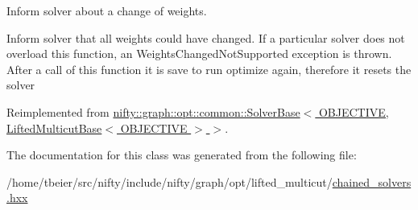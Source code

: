Inform solver about a change of weights. 

Inform solver that all weights could have changed. If a particular solver does not overload this function, an Weights\+Changed\+Not\+Supported exception is thrown. After a call of this function it is save to run optimize again, therefore it resets the solver 

Reimplemented from \hyperlink{classnifty_1_1graph_1_1opt_1_1common_1_1SolverBase_a6a5d77ee514c4b5f44d1908c1000f0ff}{nifty\+::graph\+::opt\+::common\+::\+Solver\+Base$<$ O\+B\+J\+E\+C\+T\+I\+V\+E, Lifted\+Multicut\+Base$<$ O\+B\+J\+E\+C\+T\+I\+V\+E $>$ $>$}.



The documentation for this class was generated from the following file\+:\begin{DoxyCompactItemize}
\item 
/home/tbeier/src/nifty/include/nifty/graph/opt/lifted\+\_\+multicut/\hyperlink{lifted__multicut_2chained__solvers_8hxx}{chained\+\_\+solvers.\+hxx}\end{DoxyCompactItemize}
